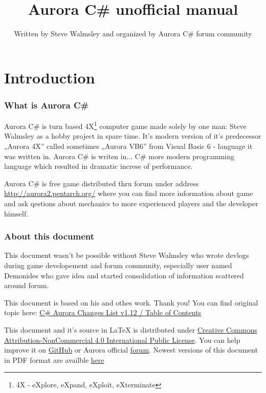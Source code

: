 \documentclass[10pt,a4paper,oneside]{article}
\author{Written by Steve Walmsley and organized by Aurora C\# forum community}
\title{Aurora C\# unofficial manual}
\begin{document}
\maketitle
\newpage
\tableofcontents

\newpage
\part{Introduction}
\section{What is Aurora C\#}
Aurora C\# is turn based 4X\footnote{4X - eXplore, eXpand, eXploit, eXterminate}
computer game made solely by one man: Steve Walmsley as a hobby project in spare time.
It's modern version of it's predecessor „Aurora 4X” called sometimes „Aurora VB6” from
Visual Basic 6 - language it was written in. Aurora C\# is writen in... C\# more modern
programming language which resulted in dramatic increse of performance.

Aurora C\# is free game distributed thru forum under address
\href{http://aurora2.pentarch.org/}{http://aurora2.pentarch.org/} where you can find
more information about game and ask qestions about mechanics to more experienced
players and the developer himself.


\section{About this document}
This document wasn't be possible without Steve Walmsley who wrote devlogs during game
developement and forum community, especially user named Demonides who gave idea and
started consolidation of information scattered around forum.

This document is based on his and othes work. Thank you! You can find original topic
here: \href{http://aurora2.pentarch.org/index.php?topic=10666.0}{C\# Aurora Changes List v1.12 / Table of Contents}

This document and it's source in LaTeX is distributed under \href{https://creativecommons.org/licenses/by-nc/4.0/}{Creative Commons Attribution-NonCommercial 4.0 International Public License}. You can help improve it
on \href{https://github.com/Pawel82S/Aurora-C-Sharp-manual}{GitHub} or Aurora official \href{http://aurora2.pentarch.org/}{forum}. Newest versions of this document in PDF format are availble \href{https://drive.google.com/drive/u/1/folders/1_AWEpFhS7e7ouguzrx8u0gnBHPhmjHoI}{here}
\end{document}
